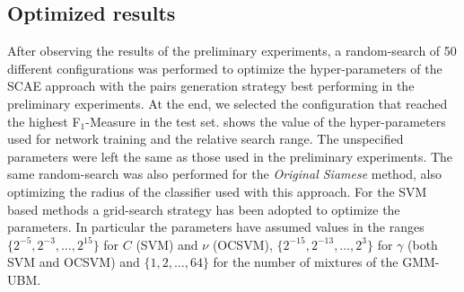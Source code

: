 \subsection{Optimized results}
\label{sec:opt_results}
After observing the results of the preliminary experiments, a random-search of 50 different configurations was performed to optimize the hyper-parameters of the SCAE approach with the pairs generation strategy best performing in the preliminary experiments. At the end, we selected the configuration that reached the highest F$_1$-Measure in the test set.  shows the value of the hyper-parameters used for network training and the relative search range. The unspecified parameters were left the same as those used in the preliminary experiments. The same random-search was also performed for the \textit{Original Siamese} method, also optimizing the radius of the classifier used with this approach. For the SVM based methods a grid-search strategy has been adopted to optimize the parameters. In particular the parameters have assumed values in the ranges  $\{ 2^{-5},2^{-3},\ldots,2^{15} \}$ for $ C $ (SVM) and $ \nu $ (OCSVM), $\{ 2^{-15},2^{-13},\ldots,2^{3} \}$ for $ \gamma $ (both SVM and OCSVM) and  $\{1,2,\ldots,64 \}$ for the number of mixtures of the GMM-UBM. 

